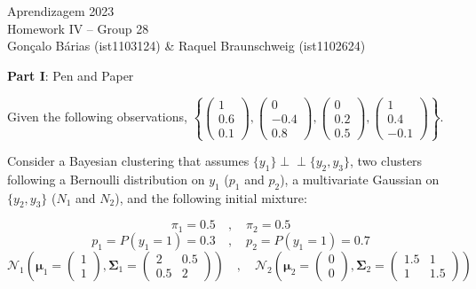 \documentclass[12pt]{article}
\newcommand{\ind}{\perp\!\!\!\perp}
\begin{document}
\begin{center}
\large{Aprendizagem 2023} \\
Homework IV -- Group 28 \\
\vskip 0.3cm
Gonçalo Bárias (ist1103124) \& Raquel Braunschweig (ist1102624)\vskip 1cm

\large{\textbf{Part I}: Pen and Paper}\normalsize
\end{center}

\noindent Given the following observations, $\left\{\begin{pmatrix} 1 \\ 0.6 \\ 0.1 \end{pmatrix}, \begin{pmatrix} 0 \\ -0.4 \\ 0.8 \end{pmatrix}, \begin{pmatrix} 0 \\ 0.2 \\ 0.5 \end{pmatrix},
\begin{pmatrix} 1 \\ 0.4 \\ -0.1 \end{pmatrix}\right\}$.

\vskip 0.2cm
\noindent Consider a Bayesian clustering that assumes $\{y_1\} \ind \{y_2, y_3\}$, two clusters following a Bernoulli distribution on $y_1$ ($p_1$ and $p_2$), a multivariate Gaussian on $\{y_2, y_3\}$ ($N_1$ and $N_2$),
and the following initial mixture:

\vskip -0.3cm
\begin{equation*}
    \pi_1 = 0.5 \quad , \quad \pi_2 = 0.5
\end{equation*}
\begin{equation*}
    p_1 = P(y_1 = 1) = 0.3 \quad , \quad p_2 = P(y_1 = 1) = 0.7
\end{equation*}
\begin{equation*}
    \mathcal{N}_1 \left(\boldsymbol{\mu}_1 = \begin{pmatrix} 1 \\ 1 \end{pmatrix}, \mathbf{\Sigma}_1 = \begin{pmatrix} 2 & 0.5 \\ 0.5 & 2 \end{pmatrix}\right) \quad
    , \quad \mathcal{N}_2 \left(\boldsymbol{\mu}_2 = \begin{pmatrix} 0 \\ 0 \end{pmatrix}, \mathbf{\Sigma}_2 = \begin{pmatrix} 1.5 & 1 \\ 1 & 1.5 \end{pmatrix}\right)
\end{equation*}
\end{document}
